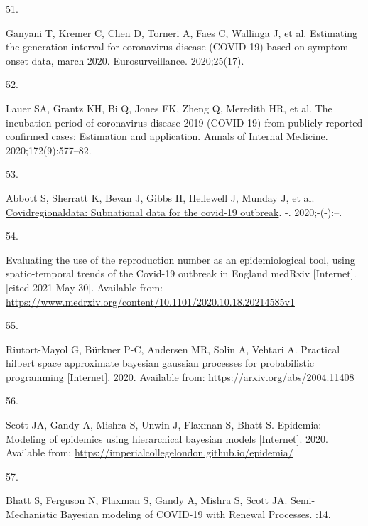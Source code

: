\documentclass[
]{article}
\newlength{\cslhangindent}
\newlength{\csllabelwidth}
\newlength{\cslentryspacingunit} %
\newenvironment{CSLReferences}[2] %
 {%
  \setlength{\parindent}{0pt}
  \ifodd #1
  \let\oldpar\par
  \def\par{\hangindent=\cslhangindent\oldpar}
  \fi
  \setlength{\parskip}{#2\cslentryspacingunit}
 }%
 {}
\newcommand{\CSLLeftMargin}[1]{\parbox[t]{\csllabelwidth}{#1}}
\newcommand{\CSLRightInline}[1]{\parbox[t]{\linewidth - \csllabelwidth}{#1}\break}
\providecommand{\DIFaddbegin}{} %
\providecommand{\DIFaddend}{} %
\providecommand{\DIFdelbegin}{} %
\providecommand{\DIFdelend}{} %
\newcommand{\DIFscaledelfig}{0.5}
\newlength{\DIFdelgraphicswidth} %
\newlength{\DIFdelgraphicsheight} %
\newcommand{\DIFaddincludegraphics}[2][]{{\color{blue}\fbox{\DIFOincludegraphics[#1]{#2}}}} %
\newcommand{\DIFdelincludegraphics}[2][]{%
\sbox{\DIFdelgraphicsbox}{\DIFOincludegraphics[#1]{#2}}%
\settoboxwidth{\DIFdelgraphicswidth}{\DIFdelgraphicsbox} %
\settoboxtotalheight{\DIFdelgraphicsheight}{\DIFdelgraphicsbox} %
\scalebox{\DIFscaledelfig}{%
\parbox[b]{\DIFdelgraphicswidth}{\usebox{\DIFdelgraphicsbox}\\[-\baselineskip] \rule{\DIFdelgraphicswidth}{0em}}\llap{\resizebox{\DIFdelgraphicswidth}{\DIFdelgraphicsheight}{%
\setlength{\unitlength}{\DIFdelgraphicswidth}%
\begin{picture}(1,1)%
\thicklines\linethickness{2pt} %
{\color[rgb]{1,0,0}\put(0,0){\framebox(1,1){}}}%
{\color[rgb]{1,0,0}\put(0,0){\line( 1,1){1}}}%
{\color[rgb]{1,0,0}\put(0,1){\line(1,-1){1}}}%
\end{picture}%
}\hspace*{3pt}}} %
} %
\DeclareRobustCommand{\DIFaddbegin}{\DIFOaddbegin \let\includegraphics\DIFaddincludegraphics} %
\DeclareRobustCommand{\DIFaddend}{\DIFOaddend \let\includegraphics\DIFOincludegraphics} %
\DeclareRobustCommand{\DIFdelbegin}{\DIFOdelbegin \let\includegraphics\DIFdelincludegraphics} %
\DeclareRobustCommand{\DIFdelend}{\DIFOaddend \let\includegraphics\DIFOincludegraphics} %
\begin{document}
\begin{CSLReferences}{0}{0}
\leavevmode{}%
\CSLLeftMargin{51. }
\CSLRightInline{Ganyani T, Kremer C, Chen D, Torneri A, Faes C, Wallinga J, et al. Estimating the generation interval for coronavirus disease (COVID-19) based on symptom onset data, march 2020. Eurosurveillance. 2020;25(17). }

\leavevmode{}%
\CSLLeftMargin{52. }
\CSLRightInline{Lauer SA, Grantz KH, Bi Q, Jones FK, Zheng Q, Meredith HR, et al. The incubation period of coronavirus disease 2019 (COVID-19) from publicly reported confirmed cases: Estimation and application. Annals of Internal Medicine. 2020;172(9):577--82. }

\leavevmode{}%
\CSLLeftMargin{53. }
\DIFdelbegin %
\DIFdelend \DIFaddbegin \CSLRightInline{Abbott S, Sherratt K, Bevan J, Gibbs H, Hellewell J, Munday J, et al. \href{https://doi.org/10.5281/zenodo.3957539}{Covidregionaldata: Subnational data for the covid-19 outbreak}. -. 2020;-(-):--. }
\DIFaddend 

\leavevmode{}%
\CSLLeftMargin{54. }
\CSLRightInline{Evaluating the use of the reproduction number as an epidemiological tool, using spatio-temporal trends of the {Covid-19} outbreak in {England} \textbar{} {medRxiv} {[}Internet{]}. {[}cited 2021 May 30{]}. Available from: \url{https://www.medrxiv.org/content/10.1101/2020.10.18.20214585v1}}

\leavevmode{}%
\CSLLeftMargin{55. }
\CSLRightInline{Riutort-Mayol G, Bürkner P-C, Andersen MR, Solin A, Vehtari A. Practical hilbert space approximate bayesian gaussian processes for probabilistic programming {[}Internet{]}. 2020. Available from: \url{https://arxiv.org/abs/2004.11408}}

\leavevmode{}%
\CSLLeftMargin{56. }
\CSLRightInline{Scott JA, Gandy A, Mishra S, Unwin J, Flaxman S, Bhatt S. Epidemia: Modeling of epidemics using hierarchical bayesian models {[}Internet{]}. 2020. Available from: \url{https://imperialcollegelondon.github.io/epidemia/}}

\leavevmode{}%
\CSLLeftMargin{57. }
\CSLRightInline{Bhatt S, Ferguson N, Flaxman S, Gandy A, Mishra S, Scott JA. Semi-{Mechanistic Bayesian} modeling of {COVID-19} with {Renewal Processes}. :14. }

\end{CSLReferences}
\end{document}

